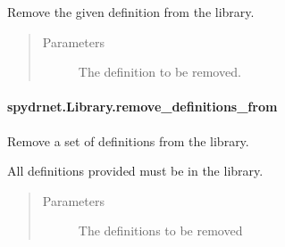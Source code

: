 \documentclass[letterpaper,10pt,english,openany,oneside]{sphinxmanual}
\begin{document}
\begin{fulllineitems}
\label{\detokenize{reference/classes/generated/spydrnet.Library.remove_definition:spydrnet.Library.remove_definition}}
Remove the given definition from the library.
\begin{quote}\begin{description}
\item[{Parameters}] \leavevmode
{} \textendash{} The definition to be removed.

\end{description}\end{quote}

\end{fulllineitems}



\paragraph{spydrnet.Library.remove\_definitions\_from}
\label{\detokenize{reference/classes/generated/spydrnet.Library.remove_definitions_from:spydrnet-library-remove-definitions-from}}\label{\detokenize{reference/classes/generated/spydrnet.Library.remove_definitions_from::doc}}

\begin{fulllineitems}
\label{\detokenize{reference/classes/generated/spydrnet.Library.remove_definitions_from:spydrnet.Library.remove_definitions_from}}
Remove a set of definitions from the library.

All definitions provided must be in the library.
\begin{quote}\begin{description}
\item[{Parameters}] \leavevmode
{} \textendash{} The definitions to be removed

\end{description}\end{quote}

\end{fulllineitems}
\end{document}
